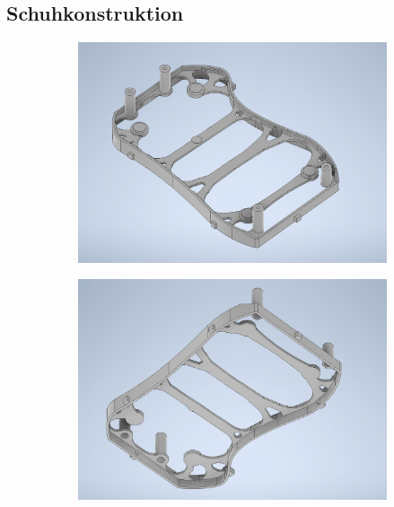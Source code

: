 \subsection{Schuhkonstruktion}
\begin{figure}[tb]
	\hfill
	\begin{subfigure}[c]{.49\linewidth}
		\centering
		\includegraphics[width=\linewidth]{Bilder/Schuh_oben.png}
	\end{subfigure}
	\begin{subfigure}[c]{.49\linewidth}
		\centering
		\includegraphics[width=\linewidth]{Bilder/Schuh_unten.png}
	\end{subfigure}
	\hfill
	\caption{}
	\label{Schuh_Inventor}
\end{figure}

